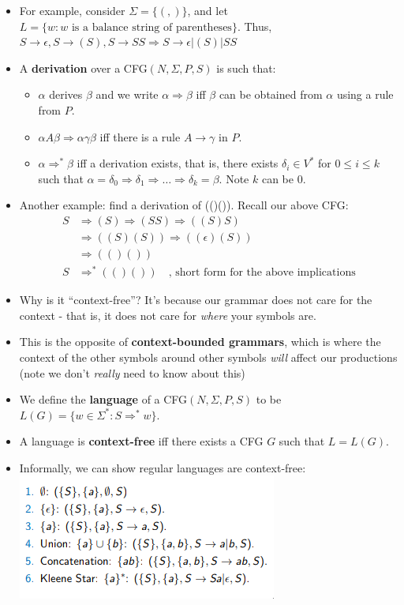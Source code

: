 \documentclass[12pt]{article}
\begin{document}
\begin{itemize}
    \item For example, consider $\Sigma = \{(, )\}$, and let $L = \{w : w \text{ is a balance string of parentheses}\}$.  Thus, $S \rightarrow \epsilon, S \rightarrow (S), S \rightarrow SS \Rightarrow S \rightarrow \epsilon | (S) | SS$ 
    \item A \textbf{derivation} over a CFG$(N, \Sigma, P, S)$ is such that:
        \begin{itemize}
            \item $\alpha$ derives $\beta$ and we write $\alpha \Rightarrow \beta$ iff $\beta$ can be obtained from $\alpha$ using a rule from $P$.
            \item $\alpha A \beta \Rightarrow \alpha \gamma \beta$ iff there is a rule $A \rightarrow \gamma$ in $P$.
            \item $\alpha \Rightarrow^* \beta$ iff a derivation exists, that is, there exists $\delta_i \in V^*$ for $0 \leq i \leq k$ such that $\alpha = \delta_0 \Rightarrow \delta_1 \Rightarrow \dots \Rightarrow \delta_k = \beta$.  Note $k$ can be 0.
        \end{itemize} 
    \item Another example: find a derivation of (()()).  Recall our above CFG:
        \begin{align*}
            S & \Rightarrow (S) \Rightarrow (SS) \Rightarrow ((S)S) \\
              & \Rightarrow ((S)(S)) \Rightarrow ((\epsilon)(S)) \\
              & \Rightarrow (()()) \\
            S & \Rightarrow^* (()()) \quad\text{, short form for the above implications}
        \end{align*}
    \item Why is it ``context-free''?  It's because our grammar does not care for the context - that is, it does not care for \emph{where} your symbols are.
    \item This is the opposite of \textbf{context-bounded grammars}, which is where the context of the other symbols around other symbols \emph{will} affect our productions (note we don't \emph{really} need to know about this)
    \item We define the \textbf{language} of a CFG$(N, \Sigma, P, S)$ to be $L(G) = \{w \in \Sigma^* : S \Rightarrow^* w\}$.
    \item A language is \textbf{context-free} iff there exists a CFG $G$ such that $L = L(G)$.
    \item Informally, we can show regular languages are context-free: \\
        \includegraphics[scale=0.8]{cg.png}
\end{itemize}
\end{document}
